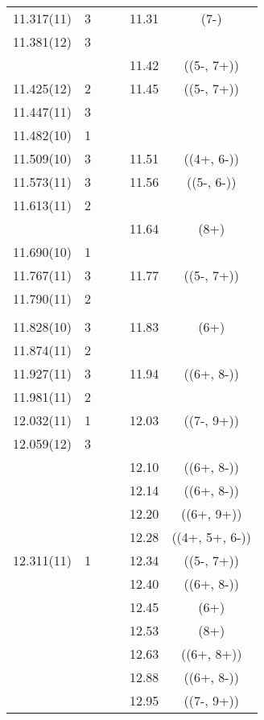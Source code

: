 \begin{center}
\begin{longtable}{cc cc cc}
    11.317(11)    & 3 &   &   & 11.31 & (7-)            \\
    11.381(12)    & 3 &   &   &   &   \\
  &   &   &   & 11.42 & ((5-, 7+))      \\
    11.425(12)    & 2 &   &   & 11.45 & ((5-, 7+))      \\
    11.447(11)    & 3 &   &   &   &   \\
    11.482(10)    & 1 &   &   &   &   \\
    11.509(10)    & 3 &   &   & 11.51 & ((4+, 6-))      \\
     11.573(11)   & 3 &   &   & 11.56 & ((5-, 6-))      \\
     11.613(11)   & 2 &   &   &   &   \\
  &   &   &   & 11.64 & (8+)            \\
   11.690(10)     & 1 &   &   &   &   \\
   11.767(11)     & 3 &   &   & 11.77 & ((5-, 7+))      \\
   11.790(11)     & 2 &   &   &   &   \\
  &   &   &   &   &   \\
   11.828(10)     & 3 &   &   & 11.83 & (6+)            \\
     11.874(11)   & 2 &   &   &   &   \\
    11.927(11)    & 3 &   &   & 11.94 & ((6+, 8-))      \\
    11.981(11)    & 2 &   &   &   &   \\
     12.032(11)   & 1 &   &   & 12.03 & ((7-, 9+))      \\
     12.059(12)   & 3 &   &   &   &   \\
  &   &   &   & 12.10 & ((6+, 8-))      \\
  &   &   &   & 12.14 & ((6+, 8-))      \\
  &   &   &   & 12.20 & ((6+, 9+))      \\
  &   &   &   & 12.28 & ((4+, 5+, 6-))  \\
    12.311(11)    & 1 &   &   & 12.34 & ((5-, 7+))      \\
  &   &   &   & 12.40 & ((6+, 8-))    \\
  &   &   &   & 12.45 & (6+)          \\
  &   &   &   & 12.53 & (8+)          \\
  &   &   &   & 12.63 & ((6+, 8+))    \\
  &   &   &   & 12.88 & ((6+, 8-))    \\
  &   &   &   & 12.95 & ((7-, 9+))    \\

\end{longtable}
\end{center}
